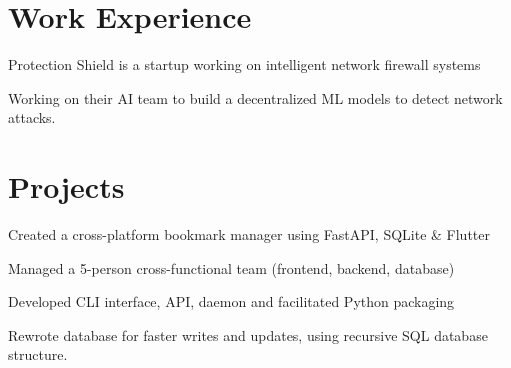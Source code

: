 \documentclass[]{resume-template}
\begin{document}
    \hfill
    \begin{minipage}[t]{0.66\textwidth}

        \section{Work Experience}\label{sec:Work Experience}
        \label{subsec:protectionshield}
        \vspace{\topsep}
        \begin{tightemize}
            \item Protection Shield is a startup working on intelligent network firewall systems
            \item Working on their AI team to build a decentralized ML models to detect network attacks.
        \end{tightemize}

        \section{Projects}\label{sec:projects}

        \label{subsec: Bookie}
        \begin{tightemize}
            \item Created a cross-platform bookmark manager using FastAPI, SQLite \& Flutter
            \item Managed a 5-person cross-functional team (frontend, backend, database)
            \item Developed CLI interface, API, daemon and facilitated Python packaging
            \item Rewrote database for faster writes and updates, using recursive SQL database structure. \\
        \end{tightemize}
        \vspace{\topsep}


\end{minipage}
\end{document}
